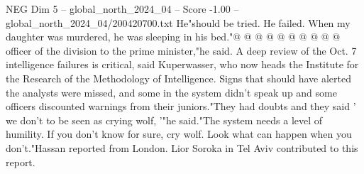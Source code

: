 \begin{textsample}{NEG Dim 5 – global\_north\_2024\_04 – Score -1.00 – global\_north\_2024\_04/200420700.txt}
He"should be tried.
He failed.
When my daughter was murdered, he was sleeping in his bed."@ @ @ @ @ @ @ @ @ @ officer of the division to the prime minister,"he said.
A deep review of the Oct. 7 intelligence failures is critical, said Kuperwasser, who now heads the Institute for the Research of the Methodology of Intelligence.
Signs that should have alerted the analysts were missed, and some in the system didn't speak up and some officers discounted warnings from their juniors."They had doubts and they said ' we don't to be seen as crying wolf, '"he said."The system needs a level of humility.
If you don't know for sure, cry wolf.
Look what can happen when you don't."Hassan reported from London.
Lior Soroka in Tel Aviv contributed to this report.

\end{textsample}
